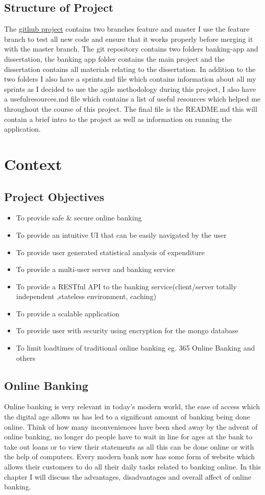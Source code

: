 \section{Structure of Project}
The \href{https://github.com/Ultan-Kearns/AppliedProject}{github project} contains two branches feature and master
I use the feature branch to test all new code and ensure that it works properly before merging it with the master
branch.  The git repository contains two folders banking-app and dissertation, the banking app folder contains the
main project and the dissertation contains all materials relating to the dissertation. In addition to the two folders
I also have a sprints.md file which contains information about all my sprints as I decided to use the agile methodology during this project, I also have a usefulresources.md file which contains a list of useful resources which helped me throughout the course of this project.  The final file is the README.md this will contain a brief intro to the project as well as information on running the application.
\chapter{Context}
\section{Project Objectives}
\begin{itemize}
  \item To provide safe \& secure online banking
  \item To provide an intuitive UI that can be easily navigated by the user
  \item To provide user generated statistical analysis of expenditure
  \item To provide a multi-user server and banking service
  \item To provide a RESTful API to the banking service(client/server totally independent
  ,stateless environment, caching)
  \item To provide a scalable application
  \item To provide user with security using encryption for the mongo database
  \item To limit loadtimes of traditional online banking eg. 365 Online Banking and others
\end{itemize}
\section{Online Banking}
Online banking is very relevant in today's modern world, the ease of access which
the digital age allows us has led to a significant amount of banking being done
online.  Think of how many inconveniences have been shed away by the advent of online
banking, no longer do people have to wait in line for ages at the bank to take out loans
or to view their statements as all this can be done online or with the help of computers.
Every modern bank now has some form of website which allows their customers to do
all their daily tasks related to banking online.  In this chapter I will discuss the
advantages, disadvantages and overall affect of online banking.
